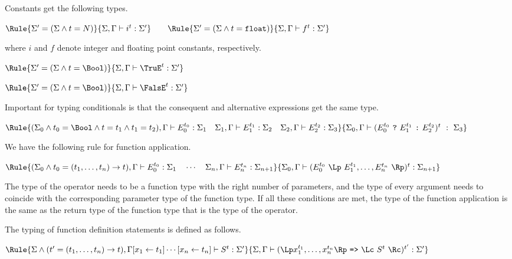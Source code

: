 Constants get the following types.

\noindent
$\Rule{\Sigma' = (\Sigma \wedge t = N)}{\Sigma, \Gamma \vdash i^t : \Sigma'}
\qquad
\Rule{\Sigma' = (\Sigma \wedge t = \texttt{float})}{\Sigma, \Gamma \vdash f^t : \Sigma'}$

\noindent
where $i$ and $f$ denote integer and floating point constants, respectively.

\noindent
$\Rule{\Sigma' = (\Sigma \wedge t = \Bool)}{\Sigma, \Gamma \vdash \TruE^t : \Sigma'}$

\noindent
$\Rule{\Sigma' = (\Sigma \wedge t = \Bool)}{\Sigma, \Gamma \vdash \FalsE^t : \Sigma'}$

\noindent
Important for typing conditionals is that the consequent and alternative
expressions get the same type. 

\noindent
$\Rule{(\Sigma_0 \wedge t_0 = \Bool \wedge t = t_1 \wedge t_1 = t_2),
          \Gamma \vdash E_0^{t_0} : \Sigma_1 \quad
\Sigma_1, \Gamma \vdash E_1^{t_1} : \Sigma_2 \quad
\Sigma_2, \Gamma \vdash E_2^{t_2} : \Sigma_3 }{
\Sigma_0, \Gamma \vdash ( E_0^{t_0}\ \texttt{?}\ E_1^{t_1}\ \texttt{:}\ E_2^{t_2})^t\ :\ \Sigma_3}$

We have the following rule for function application.

\noindent
$\Rule{(\Sigma_0 \wedge t_0 = (t_1, \ldots, t_n) \rightarrow t),
            \Gamma \vdash E_0^{t_0} : \Sigma_1 \quad \cdots \quad 
  \Sigma_n, \Gamma \vdash E_n^{t_n} : \Sigma_{n+1}}{
  \Sigma_0, \Gamma \vdash (E_0^{t_0}\ \Lp \ E_1^{t_1}, \ldots, E_n^{t_n}\ \Rp)^t : \Sigma_{n+1}}$

\noindent
The type of the operator needs to be a function type with the right
number of parameters, and the type of every argument needs to coincide
with the corresponding parameter type of the function type. If all these
conditions are met, the type of the function application is the same
as the return type of the function type that is the type of the operator.

The typing of function definition statements is defined as follows.

\noindent
$\Rule{\Sigma \wedge (t' = (t_1, \ldots, t_n) \rightarrow t), \Gamma[x_1 \leftarrow t_1]\cdots
  [x_n \leftarrow t_n]
  \vdash S^{t} : \Sigma'}{
  \Sigma, \Gamma \vdash ( \Lp  x_1^{t_1}, \ldots, x_n^{t_n} \Rp\ \texttt{=>}\ \Lc\ S^{t}\ \Rc)^{t'} : \Sigma'}$




